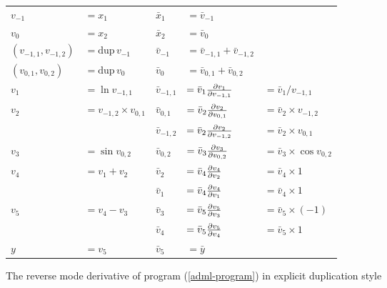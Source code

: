 \documentclass[12pt]{article}
\newcommand{\dup}{\mathrm{dup}}
\begin{document}
\begin{figure}[t]
\center
\begin{tabular}[t]{ll|lll}

  $v_{-1}$ & $= x_1$
  &
  $\bar{x}_1$ & $= \bar{v}_{-1}$
  \\
  
  $v_{0}$ & $= x_2$
  &
  $\bar{x}_2$ & $= \bar{v}_{0}$
  \\

  \hline

  \((v_{-1,1}, v_{-1,2})\) & \(= \dup \, v_{-1}\)
  &
  \(\bar{v}_{-1}\) & \(= \bar{v}_{-1,1} + \bar{v}_{-1,2}\)
  \\

  \((v_{0,1}, v_{0,2})\) & \(= \dup \, v_0\)
  &
  \(\bar{v}_{0}\) & \(= \bar{v}_{0,1} + \bar{v}_{0,2}\)
  \\

  $v_1$ & $= \ln{v_{-1,1}}$
  &
  \(\bar{v}_{-1,1}\)
  & \(
  = \bar{v}_{1} \frac{\partial v_{1}}{\partial v_{-1,1}}\)
  & \(
  = \bar{v}_1 / v_{-1,1}
  \) \\

  $v_2$ & $= v_{-1,2} \times v_{0,1}$
  &
  \(\bar{v}_{0,1}\)
  & \(
  = \bar{v}_{2} \frac{\partial v_{2}}{\partial v_{0,1}}\)
  & \(
  = \bar{v}_2 \times v_{-1,2}
  \) \\

  & &
  \(\bar{v}_{-1,2}\)
  &
  \(= \bar{v}_{2} \frac{\partial v_{2}}{\partial v_{-1,2}}\)
  & \(
  = \bar{v}_2 \times v_{0,1}
  \) \\

  $v_3$ & $= \sin{v_{0,2}}$
  &
  \(\bar{v}_{0,2}\)
  & \(
  = \bar{v}_{3} \frac{\partial v_{3}}{\partial v_{0,2}}\)
  & \(
  = \bar{v}_3 \times \cos v_{0,2}
  \) \\

  $v_4$ & $= v_1 + v_2$
  &
  \(\bar{v}_2\)
  & \(
  = \bar{v}_{4} \frac{\partial v_{4}}{\partial v_{2}}\)
  & \(
  = \bar{v}_4 \times 1
  \) \\

  & &
  \(\bar{v}_1\)
  &
  \(= \bar{v}_{4} \frac{\partial v_{4}}{\partial v_{1}}\)
  & \(
  = \bar{v}_4 \times 1
  \) \\

  $v_5$ & $= v_4 - v_3$
  &
  \(\bar{v}_3\)
  & \(
  = \bar{v}_{5} \frac{\partial v_{5}}{\partial v_{3}}\)
  & \(
  = \bar{v}_5 \times (-1)
  \) \\
  
  & &
  \(\bar{v}_4\)
  & \(
  = \bar{v}_{5} \frac{\partial v_{5}}{\partial v_{4}}\)
  & \(
  = \bar{v}_5 \times 1
  \) \\
  
  \hline

  $y$ & $= v_5$
  &
  $\bar{v}_5$ & $= \bar{y}$
  \\

\end{tabular}
\caption{\label{adml-diff-dup} The reverse mode derivative of program
  (\ref{adml-program}) in explicit duplication style}
\end{figure}
\end{document}
